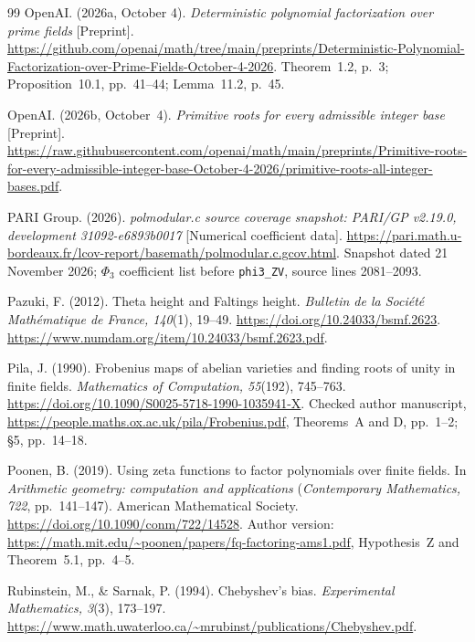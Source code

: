 \documentclass[11pt]{article}
\theoremstyle{definition}
\theoremstyle{remark}
\begin{document}
\begin{thebibliography}{99}
OpenAI. (2026a, October 4).
\emph{Deterministic polynomial factorization over prime fields}
[Preprint].
\url{https://github.com/openai/math/tree/main/preprints/Deterministic-Polynomial-Factorization-over-Prime-Fields-October-4-2026}.
Theorem~1.2, p.~3; Proposition~10.1, pp.~41--44;
Lemma~11.2, p.~45.

OpenAI. (2026b, October~4).
\emph{Primitive roots for every admissible integer base}
[Preprint].
\url{https://raw.githubusercontent.com/openai/math/main/preprints/Primitive-roots-for-every-admissible-integer-base-October-4-2026/primitive-roots-all-integer-bases.pdf}.

PARI Group. (2026).
\emph{polmodular.c source coverage snapshot: PARI/GP v2.19.0,
development 31092-e6893b0017} [Numerical coefficient data].
\url{https://pari.math.u-bordeaux.fr/lcov-report/basemath/polmodular.c.gcov.html}.
Snapshot dated 21 November 2026; $\Phi_3$ coefficient list before
\texttt{phi3\_ZV}, source lines 2081--2093.

Pazuki, F. (2012).
Theta height and Faltings height.
\emph{Bulletin de la Soci\'et\'e Math\'ematique de France, 140}(1), 19--49.
\url{https://doi.org/10.24033/bsmf.2623}.
\url{https://www.numdam.org/item/10.24033/bsmf.2623.pdf}.

Pila, J. (1990).
Frobenius maps of abelian varieties and finding roots of unity in finite fields.
\emph{Mathematics of Computation, 55}(192), 745--763.
\url{https://doi.org/10.1090/S0025-5718-1990-1035941-X}.
Checked author manuscript, \url{https://people.maths.ox.ac.uk/pila/Frobenius.pdf},
Theorems~A and D, pp.~1--2; \S5, pp.~14--18.

Poonen, B. (2019).
Using zeta functions to factor polynomials over finite fields.
In \emph{Arithmetic geometry: computation and applications}
(\emph{Contemporary Mathematics, 722}, pp.~141--147).
American Mathematical Society.
\url{https://doi.org/10.1090/conm/722/14528}.
Author version: \url{https://math.mit.edu/~poonen/papers/fq-factoring-ams1.pdf},
Hypothesis~Z and Theorem~5.1, pp.~4--5.

Rubinstein, M., \& Sarnak, P. (1994). Chebyshev's bias.
\emph{Experimental Mathematics, 3}(3), 173--197.
\url{https://www.math.uwaterloo.ca/~mrubinst/publications/Chebyshev.pdf}.


\end{thebibliography}
\end{document}
